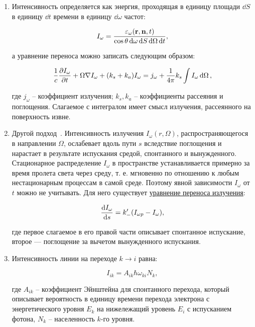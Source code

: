 \documentclass[10pt, a4paper]{article}
\begin{document}
\begin{enumerate}
	
	\item Интенсивность определяется как энергия, проходящая в единицу площади $\dd{S}$ в единицу $\dd{t}$ времени в единицу $\dd{\omega}$ частот:
	
	\begin{equation*}
		I_{\omega} = \frac{\varepsilon_\omega(\vb{r},\vb{n},t)}{\cos\theta \dd{\omega}\dd{S}\dd{\Omega}\dd{t}},
	\end{equation*}
	
	а уравнение переноса можно записать следующим образом:
	
	\begin{equation*}
		\frac{1}{c} \pdv{I_\omega}{t} + \Omega\nabla I_\omega + (k_s + k_a) I_\omega = j_\omega + \frac{1}{4\pi} k_s \int I_\omega \dd{\Omega},
	\end{equation*}
	
	где $j_\omega$ -- коэффициент излучения; $k_s, k_a$ -- коэффициенты рассеяния и поглощения. Слагаемое с интегралом имеет смысл излучения, рассеянного на поверхность извне.
	
	\item Другой подход~\cite{raizer}. Интенсивность излучения $I_\omega(r, \Omega)$, распространяющегося в направлении $\Omega$, ослабевает вдоль пути $s$ вследствие поглощения и нарастает в результате испускания средой, спонтанного и вынужденного. Стационарное распределение $I_\omega$ в пространстве устанавливается примерно за время пролета света через среду, т. е. мгновенно по отношению к любым нестационарным процессам в самой среде. Поэтому явной зависимости $I_\omega$ от $t$ можно не учитывать. Для него существует \uline{уравнение переноса излучения}:
	
	\begin{equation*}
		\dv{I_\omega}{s} = k_{-}'(I_{\omega p}-I_\omega),
	\end{equation*}
	
	где первое слагаемое в его правой части описывает спонтанное испускание, второе — поглощение за вычетом вынужденного испускания.
	
	\item Интенсивность линии на переходе
$k\rightarrow i$ равна:

	\begin{equation*}
		I_{ik} = A_{ik}\hbar\omega_{ki}N_k,
	\end{equation*}	
	
	где $A_{ik}$ -- коэффициент Эйнштейна для спонтанного перехода,
	который описывает вероятность в единицу времени перехода
	электрона с энергетического уровня $E_k$ на нижележащий 
	уровень $E_i$ с испусканием фотона, $N_k$ -- населенность $k$-го уровня.
		

\end{enumerate}
\end{document}
